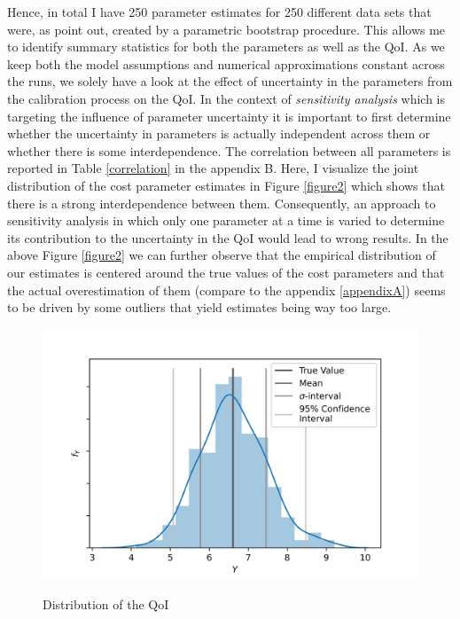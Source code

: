 Hence, in total I have 250 parameter estimates for 250 different data sets that were, as \cite{Su.Judd.2012} point out, created by a parametric bootstrap procedure. This allows me to identify summary statistics for both the parameters as well as the QoI. As we keep both the model assumptions and numerical approximations constant across the runs, we solely have a look at the effect of uncertainty in the parameters from the calibration process on the QoI. In the context of \textit{sensitivity analysis} which is targeting the influence of parameter uncertainty it is important to first determine whether the uncertainty in parameters is actually independent across them or whether there is some interdependence. The correlation between all parameters is reported in Table \ref{correlation} in the appendix B. Here, I visualize the joint distribution of the cost parameter estimates in Figure \ref{figure2} which shows that there is a strong interdependence between them. Consequently, an approach to sensitivity analysis in which only one parameter at a time is varied to determine its contribution to the uncertainty in the QoI would lead to wrong results. In the above Figure \ref{figure2} we can further observe that the empirical distribution of our estimates is centered around the true values of the cost parameters and that the actual overestimation of them (compare to the appendix \ref{appendixA}) seems to be driven by some outliers that yield estimates being way too large.

\begin{figure}[!b]
	\caption{Distribution of the QoI}
	\vspace*{-4mm}
	\centering
	\includegraphics[scale=0.9]{../figures/figure_3.png}
	\label{figure3}
\end{figure}

